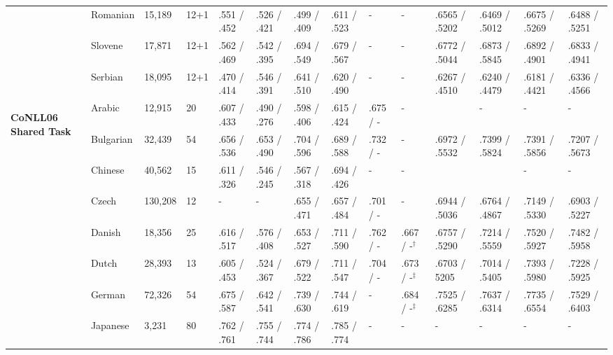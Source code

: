 \begin{landscape}
\begin{table}[ht]
\begin{flushleft}
\begin{tabular}{|l|l|l|l|p{1.5cm}|p{1.5cm}|p{1.5cm}|p{1.5cm}|p{1.5cm}|p{2cm}|p{2cm}|p{2cm}|p{2cm}|p{2cm}|}
        & Romanian   & 15,189  & 12+1 & .551 / .452   & .526 / .421   & .499 / .409   & .611 / .523   & -           & - & .6565 / .5202 & .6469 / .5012 & .6675 / .5269     & .6488 / .5251 \\
        & Slovene    & 17,871  & 12+1 & .562 / .469   & .542 / .395   & .694 / .549   & .679 / .567   & -           & - & .6772 / .5044 & .6873 / .5845 & .6892 / .4901     & .6833 / .4941 \\
        & Serbian    & 18,095  & 12+1 & .470 / .414   & .546 / .391   & .641 / .510   & .620 / .490   & -           & - & .6267 / .4510 & .6240 / .4479 & .6181 / .4421     & .6336 / .4566 \\
        \hline %
        \multirow{13}{*}{\begin{sideways}\textbf{CoNLL06 Shared Task}\end{sideways}}
        & Arabic     & 12,915  & 20   & .607 / .433   & .490 / .276   & .598 / .406   & .615 / .424   & .675 / -    & -   & & - & -               & -  \\
        & Bulgarian  & 32,439  & 54   & .656 / .536   & .653 / .490   & .704 / .596   & .689 / .588   & .732 / -    & -   & .6972 / .5532 & .7399 / .5824 & .7391 / .5856     & .7207 / .5673 \\
        & Chinese    & 40,562  & 15   & .611 / .326   & .546 / .245   & .567 / .318   & .694 / .426   & -           & -   & & & -               & -           \\
        & Czech      & 130,208 & 12   & -             & -            & .655 / .471   & .657 / .484    & .701 / -    & -   & .6944 / .5036 & .6764 / .4867 & .7149 / .5330     & .6903 / .5227 \\
        & Danish     & 18,356  & 25   & .616 / .517   & .576 / .408   & .653 / .527   & .711 / .590   & .762 / -    & .667 / -$^\dagger$& .6757 / .5290 & .7214 / .5559  & .7520 / .5927     & .7482 / .5958 \\
        & Dutch      & 28,393  & 13   & .605 / .453   & .524 / .367   & .679 / .522   & .711 / .547   & .704 / -    & .673 / -$^\ddagger$& .6703 / 5205 & .7014 / .5405  & .7393 / .5980     & .7228 / .5925 \\
        & German     & 72,326  & 54   & .675 / .587   & .642 / .541   & .739 / .630   & .744 / .619   & -           & .684 / -$^\ddagger$& .7525 / .6285 & .7637 / .6314  & .7735 / .6554     & .7529 / .6403 \\
        & Japanese   & 3,231   & 80   & .762 / .761   & .755 / .744   & .774 / .786   & .785 / .774   & -           & -   & - & - & -               & -           \\

\end{tabular}
\end{flushleft}
\end{table}
\end{landscape}
